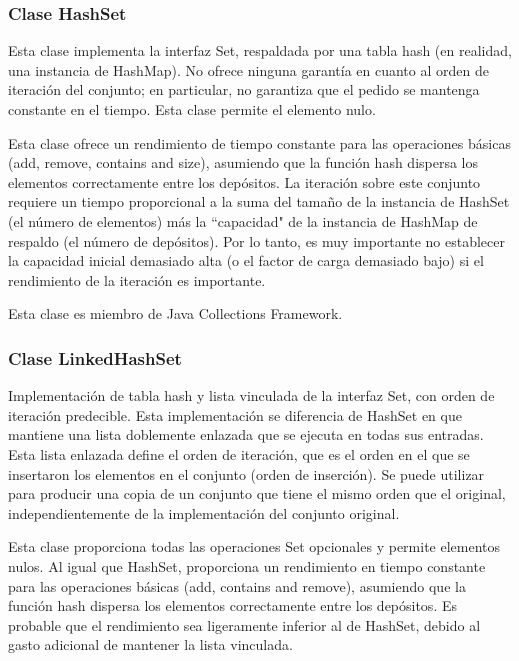 \documentclass[11pt]{article}
\begin{document}
\subsubsection{Clase HashSet}
\par
Esta clase implementa la interfaz Set, respaldada por una tabla hash (en realidad, una instancia de HashMap). No ofrece ninguna garantía 
en cuanto al orden de iteración del conjunto; en particular, no 
garantiza que el pedido se mantenga constante en el tiempo. Esta 
clase permite el elemento nulo.
\par
Esta clase ofrece un rendimiento de tiempo constante para las 
operaciones básicas (add, remove, contains and size), asumiendo que 
la función hash dispersa los elementos correctamente entre los 
depósitos. La iteración sobre este conjunto requiere un tiempo 
proporcional a la suma del tamaño de la instancia de HashSet (el 
número de elementos) más la ``capacidad" de la instancia de HashMap de 
respaldo (el número de depósitos). Por lo tanto, es muy importante no 
establecer la capacidad inicial demasiado alta (o el factor de carga 
demasiado bajo) si el rendimiento de la iteración es importante.

\par
Esta clase es miembro de Java Collections Framework.

\subsubsection{Clase LinkedHashSet}
\par
Implementación de tabla hash y lista vinculada de la interfaz Set, 
con orden de iteración predecible. Esta implementación se diferencia 
de HashSet en que mantiene una lista doblemente enlazada que se 
ejecuta en todas sus entradas. Esta lista enlazada define el orden de 
iteración, que es el orden en el que se insertaron los elementos en 
el conjunto (orden de inserción). Se puede utilizar para producir una 
copia de un conjunto que tiene el mismo orden que el original, 
independientemente de la implementación del conjunto original.
\par

Esta clase proporciona todas las operaciones Set opcionales y permite 
elementos nulos. Al igual que HashSet, proporciona un rendimiento en 
tiempo constante para las operaciones básicas (add, contains and 
remove), asumiendo que la función hash dispersa los elementos 
correctamente entre los depósitos. Es probable que el rendimiento sea 
ligeramente inferior al de HashSet, debido al gasto adicional de 
mantener la lista vinculada.
\end{document}
